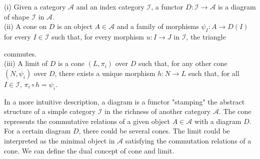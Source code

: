 \documentclass[12pt, twoside, openany]{book}
\begin{document}
\begin{definition} \label{cone_limit}
    (i) Given a category $\mathcal{A}$ and an index category $\mathcal{I}$, a functor $D: \mathcal{I} \rightarrow \mathcal{A}$ is a diagram of shape $\mathcal{I}$ in $\mathcal{A}$. \\
    (ii) A cone on $D$ is an object $A \in \mathcal {A}$ and a family of morphisms $\psi _I : A \rightarrow D(I)$ for every $I \in \mathcal{I}$ such that, for every morphism $u: I \rightarrow J$ in $\mathcal{I}$, the triangle \\
    \begin{center}
    \end{center}
    commutes. \\
    (iii) A limit of $D$ is a cone $(L, \pi_i)$ over $D$ such that, for any other cone $(N, \psi_i)$ over $D$, there exists a unique morphism $h: N \rightarrow L$ such that, for all $I \in \mathcal{I}$, $\pi_i \circ h = \psi_i$. \\
\end{definition}

In a more intuitive description, a diagram is a functor "stamping" the abstract structure of a simple category $\mathcal{I}$ in the richness of another category $\mathcal{A}$. The cone represents the commutative relations of a given object $A \in \mathcal{A}$ with a diagram $D$. For a certain diagram $D$, there could be several cones. The limit could be interpreted as the minimal object in $\mathcal{A}$ satisfying the commutation relations of a cone. We can define the dual concept of cone and limit.
\end{document}
